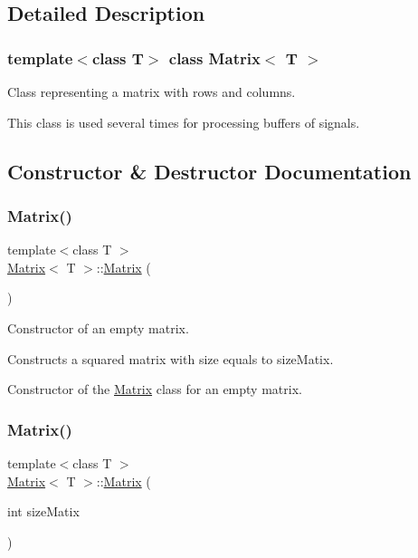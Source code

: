 \subsection{Detailed Description}
\subsubsection*{template$<$class T$>$\newline
class Matrix$<$ T $>$}

Class representing a matrix with rows and columns. 

This class is used several times for processing buffers of signals. 

\subsection{Constructor \& Destructor Documentation}
\mbox{\label{class_matrix_a9d567e3a121b1be0c3f9c461cab524fe}} 
\subsubsection{\texorpdfstring{Matrix()}{Matrix()}\hspace{0.1cm}{\footnotesize\ttfamily [1/4]}}
{\footnotesize\ttfamily template$<$class T $>$ \\
\mbox{\hyperlink{class_matrix}{Matrix}}$<$ T $>$\+::\mbox{\hyperlink{class_matrix}{Matrix}} (\begin{DoxyParamCaption}{ }\end{DoxyParamCaption})}



Constructor of an empty matrix. 

Constructs a squared matrix with size equals to size\+Matix.

Constructor of the \mbox{\hyperlink{class_matrix}{Matrix}} class for an empty matrix. \mbox{\label{class_matrix_a7ba0bf11676bcda31c984a960dd0ced5}} 
\subsubsection{\texorpdfstring{Matrix()}{Matrix()}\hspace{0.1cm}{\footnotesize\ttfamily [2/4]}}
{\footnotesize\ttfamily template$<$class T $>$ \\
\mbox{\hyperlink{class_matrix}{Matrix}}$<$ T $>$\+::\mbox{\hyperlink{class_matrix}{Matrix}} (\begin{DoxyParamCaption}\item[{int}]{size\+Matix }\end{DoxyParamCaption})}



